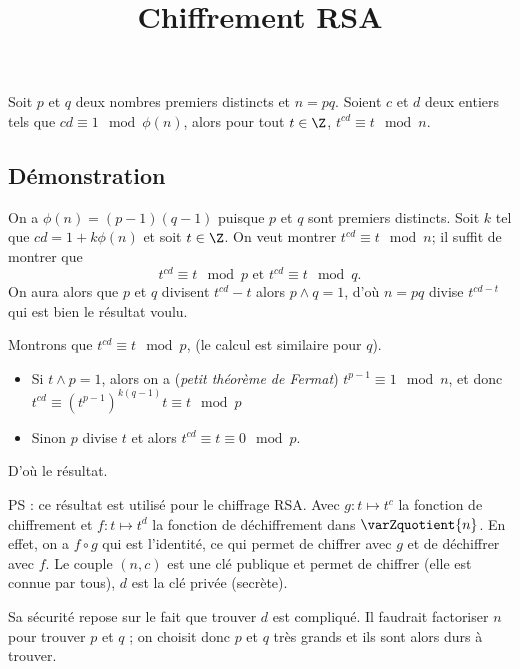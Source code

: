\documentclass[fontsize=12pt,twoside=false,parskip=half, french]{scrartcl}
\title{Chiffrement RSA}
\date{}
\author{}
\begin{document}
\maketitle 
   \begin{Theoreme}
       Soit $p$ et $q$ deux nombres premiers distincts et $n = pq$. Soient $c$ et
       $d$ deux entiers tels que $cd \equiv 1 \mod \phi(n)$, alors pour tout 
       $t \in \Z$, $t^{cd} \equiv t \mod n$.
   \end{Theoreme}
   \subsection{Démonstration}
      On a $\phi(n) = (p - 1)(q - 1)$ puisque $p$ et $q$ sont premiers distincts.
      Soit $k$ tel que $cd = 1 + k\phi(n)$ et soit $t \in \Z$. On veut montrer 
      $t^{cd} \equiv t \mod n$; il suffit de montrer que 
      \[
         t^{cd} \equiv t \mod p \text{ et } t^{cd} \equiv t \mod q.
      \]
      On aura alors que $p$ et $q$ divisent $t^{cd} - t$ alors $p \wedge q = 1$,
      d’où $n = pq$ divise $t^{cd - t}$ qui est bien le résultat voulu.
      
      Montrons que $t^{cd} \equiv t \mod p$, (le calcul est similaire pour $q$).
      \begin{itemize}
         \item Si $t \wedge p = 1$, alors on a (\emph{petit théorème de Fermat})
         $t^{p - 1} \equiv 1 \mod n$, et donc $t^{cd} \equiv (t^{p - 1})^{k(q - 1)}t \equiv t \mod p$
         \item Sinon $p$ divise $t$ et alors $t^{cd} \equiv t \equiv 0 \mod p$.
      \end{itemize}
      D’où le résultat.
      
      PS : ce résultat est utilisé pour le chiffrage RSA. Avec $g \colon t \mapsto t^c$
      la fonction de chiffrement et $f \colon t \mapsto t^d$ la fonction de déchiffrement
      dans $\varZquotient{n}$. En effet, on a $f \circ g$ qui est l’identité, ce 
      qui permet de chiffrer avec $g$ et de déchiffrer avec $f$. Le couple $(n, c)$
      est une clé publique et permet de chiffrer (elle est connue par tous), 
      $d$ est la clé privée (secrète).

      Sa sécurité repose sur le fait que trouver $d$ est compliqué. Il faudrait 
      factoriser $n$ pour trouver $p$ et $q$ ; on choisit donc $p$ et $q$ très grands
      et ils sont alors durs à trouver. 
\end{document}
